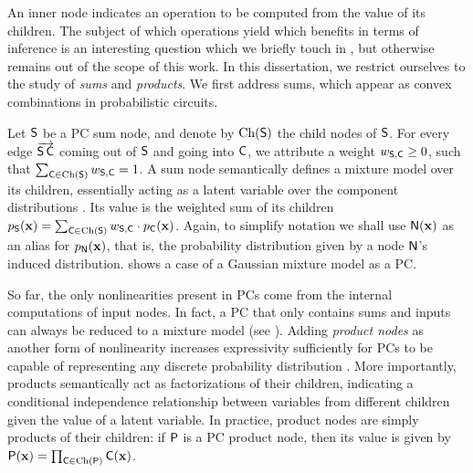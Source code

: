 An inner node indicates an operation to be computed from the value of its children. The subject of
which operations yield which benefits in terms of inference is an interesting question which we
briefly touch in , but otherwise remains out of the scope of this work. In this
dissertation, we restrict ourselves to the study of \emph{sums} and \emph{products}. We first
address sums, which appear as convex combinations in probabilistic circuits.

Let $\operatorname{\textup{\textsf{S}}}$ be a PC sum node, and denote by $\operatorname*{\normalfont{Ch}}(\operatorname{\textup{\textsf{S}}})$ the child nodes of $\operatorname{\textup{\textsf{S}}}$. For every edge
$\overrightarrow{\operatorname{\textup{\textsf{S}}}\operatorname{\textup{\textsf{C}}}}$ coming out of $\operatorname{\textup{\textsf{S}}}$ and going into $\operatorname{\textup{\textsf{C}}}$, we attribute a weight $w_{\operatorname{\textup{\textsf{S}}},
\operatorname{\textup{\textsf{C}}}}\geq 0$, such that $\sum_{\operatorname{\textup{\textsf{C}}}\in\operatorname*{\normalfont{Ch}}(\operatorname{\textup{\textsf{S}}})} w_{\operatorname{\textup{\textsf{S}}},\operatorname{\textup{\textsf{C}}}} = 1$. A sum node semantically
defines a mixture model over its children, essentially acting as a latent variable over the
component distributions \citep{poon11,peharz16}. Its value is the weighted sum of its children
$p_{\operatorname{\textup{\textsf{S}}}}(\mathbf{x})=\sum_{\operatorname{\textup{\textsf{C}}}\in\operatorname*{\normalfont{Ch}}(\operatorname{\textup{\textsf{S}}})}w_{\operatorname{\textup{\textsf{S}}},\operatorname{\textup{\textsf{C}}}}\cdot p_{\operatorname{\textup{\textsf{C}}}}(\mathbf{x})$. Again, to
simplify notation we shall use $\operatorname{\textup{\textsf{N}}}(\mathbf{x})$ as an alias for $p_{\operatorname{\textup{\textsf{N}}}}(\mathbf{x})$, that is, the
probability distribution given by a node $\operatorname{\textup{\textsf{N}}}$'s induced distribution.  shows a
case of a Gaussian mixture model as a PC.

So far, the only nonlinearities present in PCs come from the internal computations of input nodes.
In fact, a PC that only contains sums and inputs can always be reduced to a mixture model (see
). Adding \emph{product nodes} as another form of nonlinearity increases
expressivity sufficiently for PCs to be capable of representing any discrete probability
distribution \citep{darwiche03,martens14,peharz15}. More importantly, products semantically act as
factorizations of their children, indicating a conditional independence relationship between
variables from different children given the value of a latent variable. In practice, product nodes
are simply products of their children: if $\operatorname{\textup{\textsf{P}}}$ is a PC product node, then its value is given by
$\operatorname{\textup{\textsf{P}}}(\mathbf{x})=\prod_{\operatorname{\textup{\textsf{C}}}\in\operatorname*{\normalfont{Ch}}(\operatorname{\textup{\textsf{P}}})} \operatorname{\textup{\textsf{C}}}(\mathbf{x})$.


